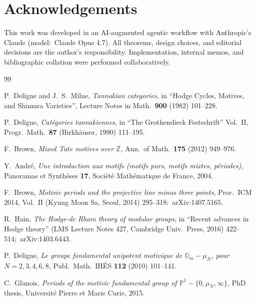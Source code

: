 \documentclass[11pt,a4paper]{article}
\theoremstyle{plain}
\theoremstyle{definition}
\begin{document}
\section*{Acknowledgements}

This work was developed in an AI-augmented agentic workflow with
Anthropic's Claude (model:\ Claude Opus 4.7). All theorems, design
choices, and editorial decisions are the author's responsibility.
Implementation, internal memos, and bibliographic collation were
performed collaboratively.

\begin{thebibliography}{99}

P.~Deligne and J.~S.~Milne, \emph{Tannakian categories}, in
``Hodge Cycles, Motives, and Shimura Varieties'', Lecture Notes in
Math.\ \textbf{900} (1982) 101--228.

P.~Deligne, \emph{Cat\'egories tannakiennes}, in ``The Grothendieck
Festschrift'' Vol.~II, Progr.\ Math.\ \textbf{87} (Birkh\"auser, 1990)
111--195.

F.~Brown, \emph{Mixed Tate motives over $\mathbb{Z}$}, Ann.\ of
Math.\ \textbf{175} (2012) 949--976.

Y.~Andr\'e, \emph{Une introduction aux motifs (motifs purs, motifs
mixtes, p\'eriodes)}, Panoramas et Synth\`eses \textbf{17}, Soci\'et\'e
Math\'ematique de France, 2004.

F.~Brown, \emph{Motivic periods and the projective line minus three
points}, Proc.\ ICM 2014, Vol.~II (Kyung Moon Sa, Seoul, 2014)
295--318;\ arXiv:1407.5165.

R.~Hain, \emph{The Hodge-de Rham theory of modular groups}, in
``Recent advances in Hodge theory'' (LMS Lecture Notes 427,
Cambridge Univ.\ Press, 2016) 422--514;\ arXiv:1403.6443.

P.~Deligne, \emph{Le groupe fondamental unipotent motivique de
$\mathbb{G}_m - \mu_N$, pour $N = 2, 3, 4, 6, 8$}, Publ.\ Math.\
IH\'ES \textbf{112} (2010) 101--141.

C.~Glanois, \emph{Periods of the motivic fundamental group of
$\mathbb{P}^1 - \{0, \mu_N, \infty\}$}, PhD thesis, Universit\'e Pierre
et Marie Curie, 2015.


\end{thebibliography}
\end{document}
